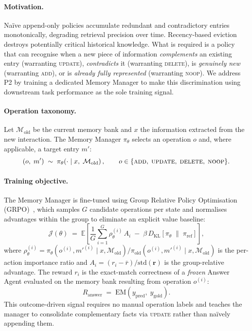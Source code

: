 \documentclass{article}
\newcommand{\memset}{\mathcal{M}}
\newcommand{\note}{m}
\begin{document}
\paragraph{Motivation.}
Naïve append-only policies accumulate redundant and contradictory entries
monotonically, degrading retrieval precision over time.
Recency-based eviction destroys potentially critical historical knowledge.
What is required is a policy that can recognise when a new piece of
information \emph{complements} an existing entry (warranting \textsc{update}),
\emph{contradicts} it (warranting \textsc{delete}), is \emph{genuinely new}
(warranting \textsc{add}), or is \emph{already fully represented} (warranting
\textsc{noop}).
We address P2 by training a dedicated Memory Manager to make this
discrimination using downstream task performance as the sole training signal.

\paragraph{Operation taxonomy.}
Let $\memset_{\mathrm{old}}$ be the current memory bank and $x$ the
information extracted from the new interaction.
The Memory Manager $\pi_\theta$ selects an operation $o$ and, where
applicable, a target entry $\note'$:
\begin{equation}
  (o,\; \note')
  \;\sim\;
  \pi_\theta\!\left(\cdot \;\middle|\; x,\; \memset_{\mathrm{old}}\right),
  \qquad
  o \in \{\textsc{add},\; \textsc{update},\; \textsc{delete},\; \textsc{noop}\}.
  \label{eq:memory_manager}
\end{equation}

\paragraph{Training objective.}
The Memory Manager is fine-tuned using Group Relative Policy Optimisation
(GRPO)~\cite{shao2024deepseekmath}, which samples $G$ candidate operations per
state and normalises advantages within the group to eliminate an explicit value
baseline:
\begin{equation}
  \mathcal{J}(\theta)
  \;=\;
  \mathbb{E}\!\left[
    \frac{1}{G}\sum_{i=1}^{G} \rho_\theta^{(i)}\, A_i
    \;-\;
    \beta\, D_{\mathrm{KL}}\!\left[\pi_\theta \;\|\; \pi_{\mathrm{ref}}\right]
  \right],
  \label{eq:grpo}
\end{equation}
where
$\rho_\theta^{(i)} = \pi_\theta(o^{(i)}, \note'^{(i)} \mid x,
\memset_{\mathrm{old}}) / \pi_{\mathrm{old}}(o^{(i)}, \note'^{(i)} \mid x,
\memset_{\mathrm{old}})$
is the per-action importance ratio and
$A_i = (r_i - \bar{r}) / \mathrm{std}(\mathbf{r})$
is the group-relative advantage.
The reward $r_i$ is the exact-match correctness of a \emph{frozen} Answer
Agent evaluated on the memory bank resulting from operation $o^{(i)}$:
\begin{equation}
  R_{\mathrm{answer}}
  \;=\;
  \mathrm{EM}(y_{\mathrm{pred}},\; y_{\mathrm{gold}}).
  \label{eq:reward}
\end{equation}
This outcome-driven signal requires no manual operation labels and teaches
the manager to consolidate complementary facts via \textsc{update} rather
than naïvely appending them.
\end{document}
